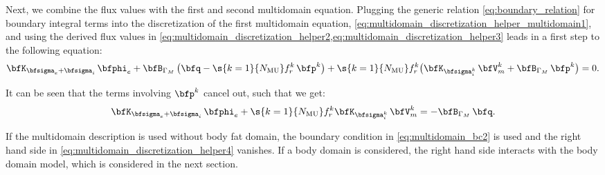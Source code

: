Next, we combine the flux values with the first and second multidomain equation.
Plugging the generic relation \cref{eq:boundary_relation} for boundary integral terms into the discretization of the first multidomain equation, \cref{eq:multidomain_discretization_helper_multidomain1}, and using the derived flux values in \cref{eq:multidomain_discretization_helper2,eq:multidomain_discretization_helper3} leads in a first step to the following equation:
\begin{align*}
  \bfK_{\bfsigma_e + \bfsigma_i}\,\bfphi_{e} + \bfB_{\Gamma_M}\,\big(\bfq - \s{k=1}{N_\text{MU}} f_r^k\,\bfp^k\big) +  \s{k=1}{N_\text{MU}} f_r^k \big(\bfK_{\bfsigma_i^k}\,\bfV_m^k + \bfB_{\Gamma_M}\,\bfp^k\big) = 0.  
\end{align*}

It can be seen that the terms involving $\bfp^k$ cancel out, such that we get:
\begin{align}\label{eq:multidomain_discretization_helper4}
    \bfK_{\bfsigma_e + \bfsigma_i}\,\bfphi_{e} + \s{k=1}{N_\text{MU}} f_r^k \bfK_{\bfsigma_i^k}\,\bfV_m^k = -\bfB_{\Gamma_M}\,\bfq.
\end{align}

If the multidomain description is used without body fat domain, the boundary condition in \cref{eq:multidomain_bc2} is used and the right hand side in \cref{eq:multidomain_discretization_helper4} vanishes. If a body domain is considered, the right hand side interacts with the body domain model, which is considered in the next section.

